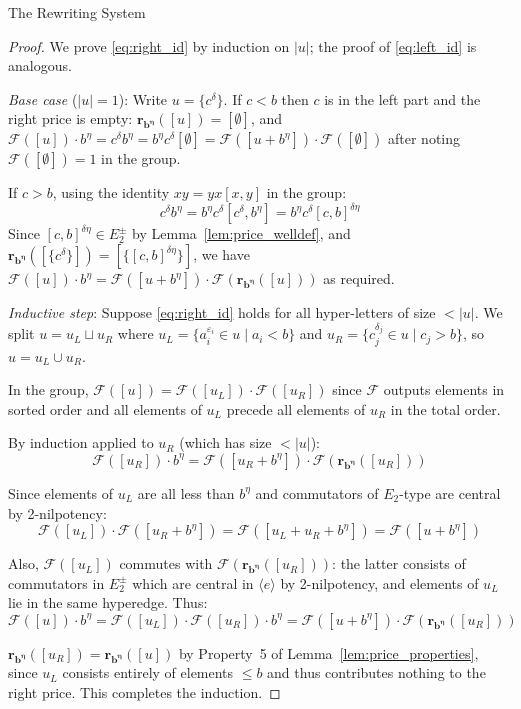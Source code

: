 \documentclass{article}
\theoremstyle{definition}
\theoremstyle{remark}
\theoremstyle{theorem}
\theoremstyle{definition}
\begin{document}
\begin{section}{The Rewriting System}
\begin{proof}
We prove \eqref{eq:right_id} by induction on $|u|$; the proof of
\eqref{eq:left_id} is analogous.

\textit{Base case} ($|u|=1$): Write $u = \{c^{\delta}\}$. If $c < b$
then $c$ is in the left part and the right price is empty:
$\mathbf{r_{b^\eta}}([u]) = [\emptyset]$, and $\mathcal{F}([u]) \cdot b^\eta
= c^\delta b^\eta = b^\eta c^\delta [\emptyset] = \mathcal{F}([u+b^\eta])
\cdot \mathcal{F}([\emptyset])$ after noting $\mathcal{F}([\emptyset])=1$
in the group.

If $c > b$, using the identity $xy = yx[x,y]$ in the group:
$$c^\delta b^\eta = b^\eta c^\delta [c^\delta, b^\eta] = b^\eta c^\delta [c,b]^{\delta\eta}$$
Since $[c,b]^{\delta\eta} \in E_2^\pm$ by Lemma~\ref{lem:price_welldef}, and
$\mathbf{r_{b^\eta}}([\{c^\delta\}]) = [\{[c,b]^{\delta\eta}\}]$, we have
$\mathcal{F}([u])\cdot b^\eta = \mathcal{F}([u+b^\eta])\cdot
\mathcal{F}(\mathbf{r_{b^\eta}}([u]))$ as required.

\textit{Inductive step}: Suppose \eqref{eq:right_id} holds for all hyper-letters
of size $< |u|$. We split $u = u_L \sqcup u_R$
where $u_L = \{a_i^{\varepsilon_i} \in u \mid a_i < b\}$ and
$u_R = \{c_j^{\delta_j} \in u \mid c_j > b\}$, so $u = u_L \cup u_R$.

In the group, $\mathcal{F}([u]) = \mathcal{F}([u_L])\cdot\mathcal{F}([u_R])$
since $\mathcal{F}$ outputs elements in sorted order and all elements of $u_L$
precede all elements of $u_R$ in the total order.

By induction applied to $u_R$ (which has size $< |u|$):
$$\mathcal{F}([u_R])\cdot b^\eta = \mathcal{F}([u_R + b^\eta])\cdot
\mathcal{F}(\mathbf{r_{b^\eta}}([u_R]))$$

Since elements of $u_L$ are all less than $b^\eta$ and commutators of $E_2$-type
are central by 2-nilpotency:
$$\mathcal{F}([u_L])\cdot\mathcal{F}([u_R + b^\eta]) = \mathcal{F}([u_L + u_R + b^\eta])
= \mathcal{F}([u + b^\eta])$$

Also, $\mathcal{F}([u_L])$ commutes with $\mathcal{F}(\mathbf{r_{b^\eta}}([u_R]))$:
the latter consists of commutators in $E_2^\pm$ which are central in $\langle e\rangle$
by 2-nilpotency, and elements of $u_L$ lie in the same hyperedge. Thus:
$$\mathcal{F}([u])\cdot b^\eta = \mathcal{F}([u_L])\cdot\mathcal{F}([u_R])\cdot b^\eta
= \mathcal{F}([u+b^\eta])\cdot\mathcal{F}(\mathbf{r_{b^\eta}}([u_R]))$$

$\mathbf{r_{b^\eta}}([u_R]) =
\mathbf{r_{b^\eta}}([u])$ by Property~5 of Lemma~\ref{lem:price_properties}, since $u_L$ consists entirely of elements $\leq b$ and thus contributes nothing to the right price.
This completes the induction.
\end{proof}


\end{section}
\end{document}
